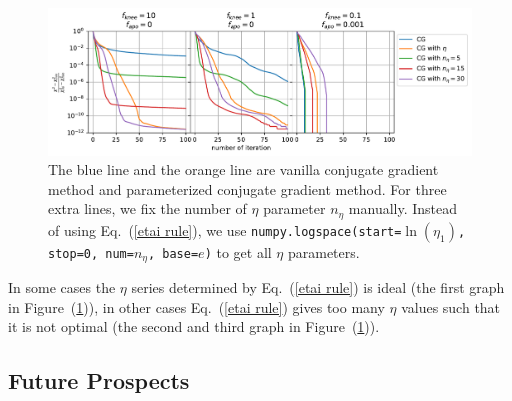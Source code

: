\documentclass[twocolumn,linenumbers]{aastex631}
\newcommand{\kmh}[1]{\textcolor{red}{KMH: #1}}
\begin{document}
\begin{figure}[htb!]
\centering
\includegraphics[width=\textwidth]{chi2_neta.pdf}
\caption{The blue line and the orange line are 
vanilla conjugate gradient method and parameterized conjugate gradient method.
For three extra lines, we fix the number of $\eta$ parameter $n_{\eta}$ manually.
Instead of using Eq.~(\ref{etai rule}), we use
\texttt{numpy.logspace(start=$\ln(\eta_1)$, stop=0, num=$n_{\eta}$, base=$e$)}
to get all $\eta$ parameters.
}
\label{chi2 neta}
\end{figure}

In some cases the $\eta$ series determined by Eq.~(\ref{etai rule}) is ideal
(the first graph in Figure~(\ref{chi2 neta})), in other cases Eq.~(\ref{etai rule})
gives too many $\eta$ values such that it is not optimal (the second and third
graph in Figure~(\ref{chi2 neta})).





\subsection{Future Prospects}
\end{document}
